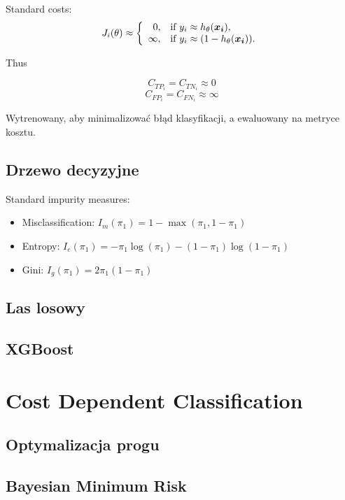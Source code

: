 \documentclass{book}
\begin{document}

    Standard costs:
	$$
	J_i(\theta) \approx \left\{
	\begin{array}{rl}
	0, &\mbox{if $y_i \approx h_{\theta}(\boldsymbol{x_i})$}, \\
	\infty, &\mbox{if $y_i \approx (1 - h_{\theta}(\boldsymbol{x_i}))$}.
	\end{array}{}
	\right.
	$$
	
	Thus
	
	$$ C_{TP_i} = C_{TN_i} \approx 0 $$
	$$ C_{FP_i} = C_{FN_i} \approx \infty $$

	Wytrenowany, aby minimalizować błąd klasyfikacji, a ewaluowany na metryce kosztu.

\subsection{Drzewo decyzyjne}

	Standard impurity measures:
	\begin{itemize}
		\item Misclassification: $I_m(\pi_1) = 1 - \max(\pi_1, 1 - \pi_1)$
		\item Entropy: $I_e(\pi_1) = -\pi_1 \log(\pi_1) - (1 - \pi_1) \log (1 - \pi_1)$
		\item Gini: $I_g(\pi_1) = 2 \pi_1 (1 - \pi_1)$
	\end{itemize}{}

\subsection{Las losowy}

\subsection{XGBoost}

\section{Cost Dependent Classification}
	
	\subsection{Optymalizacja progu}
	
	
	
	\subsection{Bayesian Minimum Risk}
	
\end{document}
